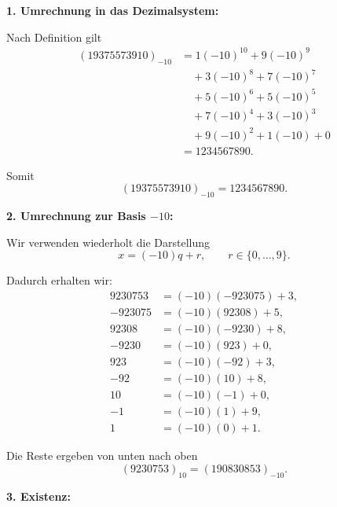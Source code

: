 \documentclass{report}
\begin{document}

\begin{myproof}
  \textbf{1. Umrechnung in das Dezimalsystem:}

  Nach Definition gilt
  \begin{align*}
    (19375573910)_{-10}
    &=1(-10)^{10}+9(-10)^9\\
    &\quad+3(-10)^8+7(-10)^7\\
    &\quad+5(-10)^6+5(-10)^5\\
    &\quad+7(-10)^4+3(-10)^3\\
    &\quad+9(-10)^2+1(-10)+0\\
    &=1234567890.
  \end{align*}

  Somit
  \[
    \boxed{(19375573910)_{-10}=1234567890.}
  \]

  \medskip
  \textbf{2. Umrechnung zur Basis $-10$:}

  Wir verwenden wiederholt die Darstellung
  \[
    x=(-10)q+r,
    \qquad r\in\{0,\dots,9\}.
  \]

  Dadurch erhalten wir:
  \begin{align*}
    9230753&=(-10)(-923075)+3,\\
    -923075&=(-10)(92308)+5,\\
    92308&=(-10)(-9230)+8,\\
    -9230&=(-10)(923)+0,\\
    923&=(-10)(-92)+3,\\
    -92&=(-10)(10)+8,\\
    10&=(-10)(-1)+0,\\
    -1&=(-10)(1)+9,\\
    1&=(-10)(0)+1.
  \end{align*}

  Die Reste ergeben von unten nach oben
  \[
    \boxed{(9230753)_{10}=(190830853)_{-10}.}
  \]

  \medskip
  \textbf{3. Existenz:}


\end{myproof}
\end{document}
